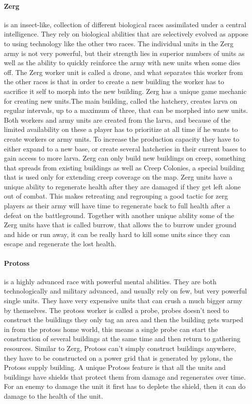 \paragraph{Zerg} is an insect-like, collection of different biological races assimilated under a central intelligence. They rely on biological abilities that are selectively evolved as appose to using technology like the other two races. The individual units in the Zerg army is not very powerful, but their strength lies in superior numbers of units as well as the ability to quickly reinforce the army with new units when some dies off. The Zerg worker unit is called a drone, and what separates this worker from the other races is that in order to create a new building the worker has to sacrifice it self to morph into the new building. Zerg has a unique game mechanic for creating new units.The main building, called the hatchery, creates larva on regular intervals, up to a maximum of three, that can be morphed into new units. Both workers and army units are created from the larva, and because of the limited availability on these a player has to prioritize at all time if he wants to create workers or army units. To increase the production capacity they have to either expand to a new base, or create several hatcheries in their current bases to gain access to more larva. Zerg can only build new buildings on creep, something that spreads from existing buildings as well as Creep Colonies, a special building that is used only for extending creep coverage on the map. Zerg units have a unique ability to regenerate health after they are damaged if they get left alone out of combat. This makes retreating and regrouping a good tactic for zerg players as their army will have time to regenerate back to full health after a defeat on the battleground. Together with another unique ability some of the Zerg units have that is called burrow, that allows the to burrow under ground and hide or run away, it can be really hard to kill some units since they can escape and regenerate the lost health. 

\paragraph{Protoss} is a highly advanced race with powerful mental abilities. They are both technologically and military advanced, and usually rely on few, but very powerful single units. They have very expensive units that can crush a much bigger army by themselves. The protoss worker is called a probe, probes doesn't need to construct the buildings they only tag an area and then the building gets warped in from the protoss home world, this means a single probe can start the construction of several buildings at the same time and then return to gathering resources. Similar to Zerg, Protoss can't simply construct buildings anywhere, they have to be constructed on a power grid that is generated by pylons, the Protoss supply building. A unique Protoss feature is that all the units and buildings have shields that protect them from damage and regenerates over time. For an enemy to damage the unit it first has to deplete the shield, then it can do damage to the health of the unit. 


